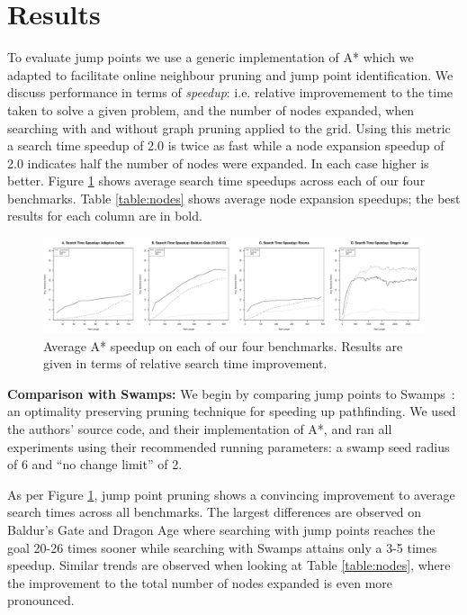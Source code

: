 \section{Results}
To evaluate jump points we use a generic implementation of A* which we 
adapted to facilitate online neighbour pruning and jump point identification.
We discuss
performance in terms of \emph{speedup}: i.e. relative improvemement to the time 
taken to solve a given problem, and the number of nodes expanded, when searching
with and without graph pruning applied to the grid.
Using this metric a search time speedup
of 2.0 is twice as fast while a node expansion speedup of 2.0 indicates half the
number of nodes were expanded.  In each case higher is better.
Figure \ref{fig:speedup} shows average search time speedups across
each of our four benchmarks. Table \ref{table:nodes} shows average
node expansion speedups; the best results for each column are in bold.



\begin{figure}[t]
   \begin{center}
	   \includegraphics[width=2.0\columnwidth, trim = 10mm 10mm 10mm 0mm]
		{diagrams/speedup.pdf}
   \end{center}
   \caption{Average A* speedup on each of our four benchmarks. 
	Results are given in terms of relative search time improvement.}
\label{fig:speedup}
\end{figure}

\textbf{Comparison with Swamps: }
We begin by comparing jump points to Swamps~\cite{pochter10}: an optimality
preserving pruning technique for speeding up pathfinding.  
We used the authors' source code, and their implementation of A*, and ran
all experiments using their recommended running parameters: a swamp seed radius
of 6 and ``no change limit'' of 2.

As per Figure \ref{fig:speedup}, jump point pruning shows a convincing
improvement to average search times across all benchmarks.
The largest differences are
observed on Baldur's Gate and Dragon Age where searching with jump points
reaches the goal 20-26 times sooner while searching with Swamps attains only a 3-5
times speedup.  Similar trends are observed when looking at Table
\ref{table:nodes}, where the improvement to the total number of nodes expanded
is even more pronounced.

